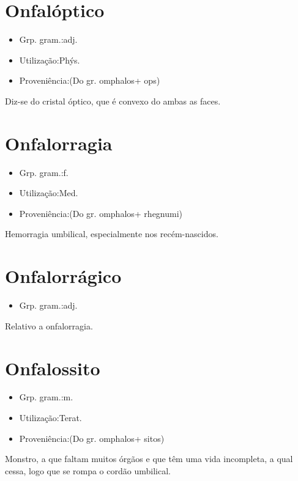 \section{Onfalóptico}
\begin{itemize}
\item {Grp. gram.:adj.}
\end{itemize}
\begin{itemize}
\item {Utilização:Phýs.}
\end{itemize}
\begin{itemize}
\item {Proveniência:(Do gr. \textunderscore omphalos\textunderscore  + \textunderscore ops\textunderscore )}
\end{itemize}
Diz-se do cristal óptico, que é convexo do ambas as faces.
\section{Onfalorragia}
\begin{itemize}
\item {Grp. gram.:f.}
\end{itemize}
\begin{itemize}
\item {Utilização:Med.}
\end{itemize}
\begin{itemize}
\item {Proveniência:(Do gr. \textunderscore omphalos\textunderscore  + \textunderscore rhegnumi\textunderscore )}
\end{itemize}
Hemorragia umbilical, especialmente nos recém-nascidos.
\section{Onfalorrágico}
\begin{itemize}
\item {Grp. gram.:adj.}
\end{itemize}
Relativo a onfalorragia.
\section{Onfalossito}
\begin{itemize}
\item {Grp. gram.:m.}
\end{itemize}
\begin{itemize}
\item {Utilização:Terat.}
\end{itemize}
\begin{itemize}
\item {Proveniência:(Do gr. \textunderscore omphalos\textunderscore  + \textunderscore sitos\textunderscore )}
\end{itemize}
Monstro, a que faltam muitos órgãos e que têm uma vida incompleta, a qual cessa, logo que se rompa o cordão umbilical.
